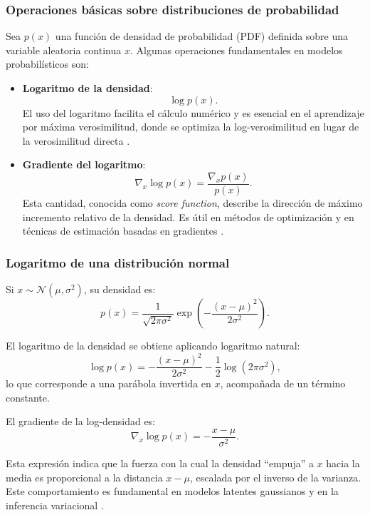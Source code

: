 \documentclass[12pt,letterpaper]{article}
\begin{document}
\subsubsection{Operaciones básicas sobre distribuciones de probabilidad}

Sea \(p(x)\) una función de densidad de probabilidad (PDF) definida sobre una variable 
aleatoria continua \(x\). Algunas operaciones fundamentales en modelos probabilísticos son:

\begin{itemize}
    \item \textbf{Logaritmo de la densidad}:
    \[
        \log p(x).
    \]
    El uso del logaritmo facilita el cálculo numérico y es esencial en el aprendizaje por 
    máxima verosimilitud, donde se optimiza la log-verosimilitud en lugar de la 
    verosimilitud directa \cite{bishop2006pattern}.

    \item \textbf{Gradiente del logaritmo}:
    \[
        \nabla_x \log p(x) = \frac{\nabla_x p(x)}{p(x)}.
    \]
    Esta cantidad, conocida como \textit{score function}, describe la dirección de máximo 
    incremento relativo de la densidad. Es útil en métodos de optimización y en técnicas de 
    estimación basadas en gradientes \cite{murphy2023pml}.
\end{itemize}

\subsubsection{Logaritmo de una distribución normal}

Si \(x \sim \mathcal{N}(\mu,\sigma^2)\), su densidad es:
\[
p(x) = \frac{1}{\sqrt{2\pi\sigma^2}}
\exp\left(-\frac{(x-\mu)^2}{2\sigma^2}\right).
\]

El logaritmo de la densidad se obtiene aplicando logaritmo natural:
\[
\log p(x)
= -\frac{(x-\mu)^2}{2\sigma^2}
  -\frac{1}{2}\log(2\pi\sigma^2),
\]
lo que corresponde a una parábola invertida en \(x\), acompañada de un término constante.

El gradiente de la log-densidad es:
\[
\nabla_x \log p(x) = -\frac{x-\mu}{\sigma^2}.
\]

Esta expresión indica que la fuerza con la cual la densidad ``empuja'' a \(x\) hacia la media 
es proporcional a la distancia \(x-\mu\), escalada por el inverso de la varianza. Este 
comportamiento es fundamental en modelos latentes gaussianos y en la inferencia variacional 
\cite{kingma2013auto}.
\end{document}

